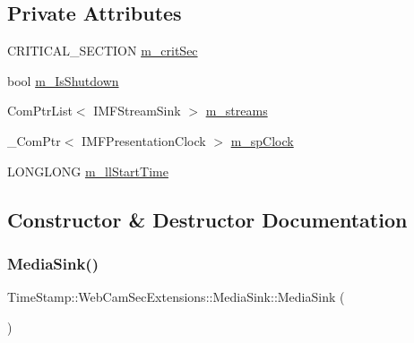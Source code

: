 \subsection*{Private Attributes}
\begin{DoxyCompactItemize}
\item 
C\+R\+I\+T\+I\+C\+A\+L\+\_\+\+S\+E\+C\+T\+I\+ON \hyperlink{class_time_stamp_1_1_web_cam_sec_extensions_1_1_media_sink_a6695da6a776c1cea6402b8fd7ae92429}{m\+\_\+crit\+Sec}
\item 
bool \hyperlink{class_time_stamp_1_1_web_cam_sec_extensions_1_1_media_sink_a4c65b664ceaf2dd0d3350b1e1e9a2edd}{m\+\_\+\+Is\+Shutdown}
\item 
Com\+Ptr\+List$<$ I\+M\+F\+Stream\+Sink $>$ \hyperlink{class_time_stamp_1_1_web_cam_sec_extensions_1_1_media_sink_a362055699c2559630e03dc78a16c6e34}{m\+\_\+streams}
\item 
\+\_\+\+Com\+Ptr$<$ I\+M\+F\+Presentation\+Clock $>$ \hyperlink{class_time_stamp_1_1_web_cam_sec_extensions_1_1_media_sink_afd39b48c5c207fd8656e021b6226deca}{m\+\_\+sp\+Clock}
\item 
L\+O\+N\+G\+L\+O\+NG \hyperlink{class_time_stamp_1_1_web_cam_sec_extensions_1_1_media_sink_a0096bed760330bdc75cbdc426d016355}{m\+\_\+ll\+Start\+Time}
\end{DoxyCompactItemize}


\subsection{Constructor \& Destructor Documentation}
\mbox{\label{class_time_stamp_1_1_web_cam_sec_extensions_1_1_media_sink_a26ccc9b7b50079c5fd1309d56a31a088}} 
\subsubsection{\texorpdfstring{Media\+Sink()}{MediaSink()}}
{\footnotesize\ttfamily Time\+Stamp\+::\+Web\+Cam\+Sec\+Extensions\+::\+Media\+Sink\+::\+Media\+Sink (\begin{DoxyParamCaption}{ }\end{DoxyParamCaption})\hspace{0.3cm}{\ttfamily [inline]}}

